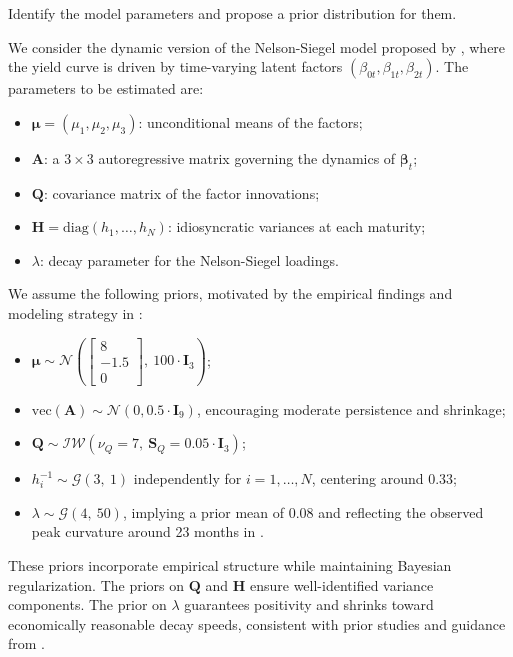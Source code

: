 Identify the model parameters and propose a prior distribution for them.


We consider the dynamic version of the Nelson-Siegel model proposed by \citet{diebold2006macroeconomy}, where the yield curve is driven by time-varying latent factors $(\beta_{0t}, \beta_{1t}, \beta_{2t})$. The parameters to be estimated are:

\begin{itemize}
  \item $\boldsymbol{\mu} = (\mu_1, \mu_2, \mu_3)$: unconditional means of the factors;
  \item $\mathbf{A}$: a $3 \times 3$ autoregressive matrix governing the dynamics of $\boldsymbol{\beta}_t$;
  \item $\mathbf{Q}$: covariance matrix of the factor innovations;
  \item $\mathbf{H} = \mathrm{diag}(h_1, \ldots, h_N)$: idiosyncratic variances at each maturity;
  \item $\lambda$: decay parameter for the Nelson-Siegel loadings.
\end{itemize}

We assume the following priors, motivated by the empirical findings and modeling strategy in \citet{diebold2006macroeconomy}:

\begin{itemize}
  \item $\boldsymbol{\mu} \sim \mathcal{N}\left( 
    \begin{bmatrix} 8 \\ -1.5 \\ 0 \end{bmatrix},\ 
    100 \cdot \mathbf{I}_3 \right)$;
  \item $\mathrm{vec}(\mathbf{A}) \sim \mathcal{N}(0, 0.5 \cdot \mathbf{I}_9)$, encouraging moderate persistence and shrinkage;
  \item $\mathbf{Q} \sim \mathcal{IW}(\nu_Q = 7,\ \mathbf{S}_Q = 0.05 \cdot \mathbf{I}_3)$;
  \item $h_i^{-1} \sim \mathcal{G}(3,\ 1)$ independently for $i = 1, \dots, N$, centering around 0.33;
  \item $\lambda \sim \mathcal{G}(4,\ 50)$, implying a prior mean of 0.08 and reflecting the observed peak curvature around 23 months in \citet{diebold2006macroeconomy}.
\end{itemize}

These priors incorporate empirical structure while maintaining Bayesian regularization. The priors on $\mathbf{Q}$ and $\mathbf{H}$ ensure well-identified variance components. The prior on $\lambda$ guarantees positivity and shrinks toward economically reasonable decay speeds, consistent with prior studies and guidance from \citet{koop2010bayesian}.
